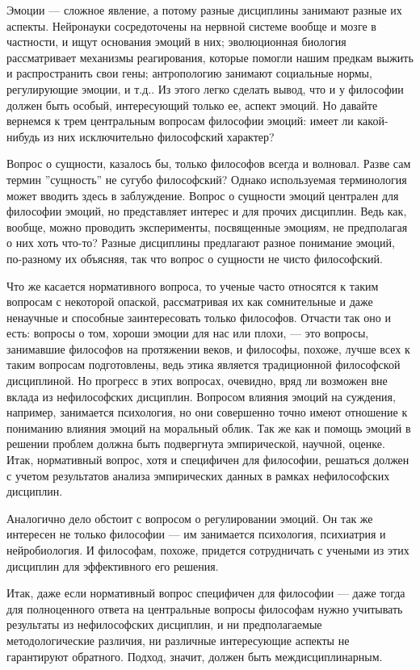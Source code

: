 \documentclass[11pt]{book}
\begin{document}
Эмоции --- сложное явление, а потому разные дисциплины занимают разные их аспекты. Нейронауки сосредоточены на нервной системе вообще и мозге в частности, и ищут основания эмоций в них; эволюционная биология рассматривает механизмы реагирования, которые помогли нашим предкам выжить и распространить свои гены; антропологию занимают социальные нормы, регулирующие эмоции, и т.д.. Из этого легко сделать вывод, что и у философии должен быть особый, интересующий только ее, аспект эмоций. Но давайте вернемся к трем центральным вопросам философии эмоций: имеет ли какой-нибудь из них исключительно философский характер?

Вопрос о сущности, казалось бы, только философов всегда и волновал. Разве сам термин ''сущность'' не сугубо философский? Однако используемая терминология может вводить здесь в заблуждение. Вопрос о сущности эмоций централен для философии эмоций, но представляет интерес и для прочих дисциплин. Ведь как, вообще, можно проводить эксперименты, посвященные эмоциям, не предполагая о них хоть что-то? Разные дисциплины предлагают разное понимание эмоций, по-разному их объясняя, так что вопрос о сущности не чисто философский.

Что же касается нормативного вопроса, то ученые часто относятся к таким вопросам с некоторой опаской, рассматривая их как сомнительные и даже ненаучные и способные заинтересовать только философов. Отчасти так оно и есть: вопросы о том, хороши эмоции для нас или плохи, --- это вопросы, занимавшие философов на протяжении веков, и философы, похоже, лучше всех к таким вопросам подготовлены, ведь этика является традиционной философской дисциплиной. Но прогресс в этих вопросах, очевидно, вряд ли возможен вне вклада из нефилософских дисциплин. Вопросом влияния эмоций на суждения, например, занимается психология, но они совершенно точно имеют отношение к пониманию влияния эмоций на моральный облик. Так же как и помощь эмоций в решении проблем должна быть подвергнута эмпирической, научной, оценке. Итак, нормативный вопрос, хотя и специфичен для философии, решаться должен с учетом результатов анализа эмпирических данных в рамках нефилософских дисциплин.

Аналогично дело обстоит с вопросом о регулировании эмоций. Он так же интересен не только философии --- им занимается психология, психиатрия и нейробиология. И философам, похоже, придется сотрудничать с учеными из этих дисциплин для эффективного его решения.

Итак, даже если нормативный вопрос специфичен для философии --- даже тогда для полноценного ответа на центральные вопросы философам нужно учитывать результаты из нефилософских дисциплин, и ни предполагаемые методологические различия, ни различные интересующие аспекты не гарантируют обратного. Подход, значит, должен быть междисциплинарным.
\end{document}
